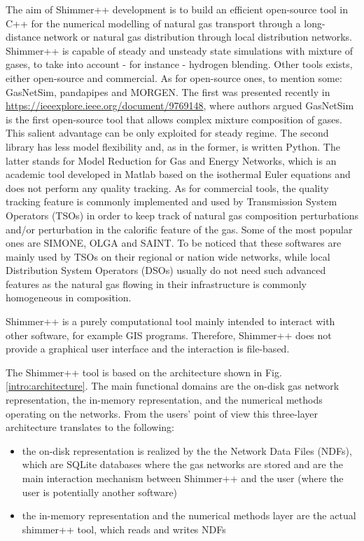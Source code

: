 The aim of Shimmer++ development is to build an efficient open-source tool in C++ for the numerical modelling of natural gas transport through a long-distance network or natural gas distribution through local distribution networks. Shimmer++ is capable of steady and unsteady state simulations with mixture of gases, to take into account - for instance - hydrogen blending. Other tools exists, either open-source and commercial. As for open-source ones, to mention some: GasNetSim, pandapipes and MORGEN. The first was presented recently in \url{https://ieeexplore.ieee.org/document/9769148}, where authors argued GasNetSim is the first open-source tool that allows complex mixture composition of gases. This salient advantage can be only exploited for steady regime. The second library has less model flexibility and, as in the former, is written Python. The latter stands for Model Reduction for Gas and Energy Networks, which is an academic tool developed in Matlab based on the isothermal Euler equations and does not perform any quality tracking. As for commercial tools, the quality tracking feature is commonly implemented and used by Transmission System Operators (TSOs) in order to keep track of natural gas composition perturbations and/or perturbation in the calorific feature of the gas. Some of the most popular ones are SIMONE, OLGA and SAINT. To be noticed that these softwares are mainly used by TSOs on their regional or nation wide networks, while local Distribution System Operators (DSOs) usually do not need such advanced features as the natural gas flowing in their infrastructure is commonly homogeneous in composition.

Shimmer++ is a purely computational tool mainly intended to interact with other software, for example GIS programs. Therefore, Shimmer++ does not provide a graphical user interface and the interaction is file-based.

The Shimmer++ tool is based on the architecture shown in Fig. \ref{intro:architecture}. The main functional domains are the on-disk gas network representation, the in-memory representation, and the numerical methods operating on the networks. From the users' point of view this three-layer architecture translates to the following:
\begin{itemize}
    \item the on-disk representation is realized by the the Network Data Files (NDFs), which are SQLite databases where the gas networks are stored and are the main interaction mechanism between Shimmer++ and the user (where the user is potentially another software)
    \item the in-memory representation and the numerical methods layer are the actual shimmer++ tool, which reads and writes NDFs
\end{itemize}

